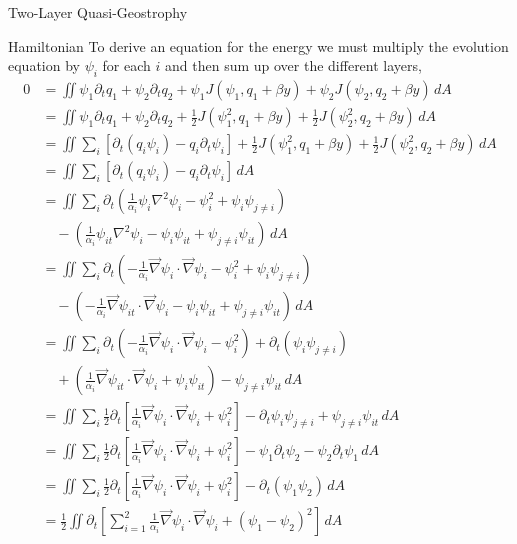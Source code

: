 \documentclass[12pt]{article}
\begin{document}
\begin{section}{Two-Layer Quasi-Geostrophy}
    \begin{subsection}{Hamiltonian}
        To derive an equation for the energy we must multiply the evolution equation by $\psi_i$ for each $i$ and then sum up over the different layers,
        \begin{align*}
            0 &= \iint \psi_1 \partial_t q_1 + \psi_2 \partial_t q_2 + \psi_1 J(\psi_1, q_1 + \beta y) + \psi_2 J(\psi_2, q_2 + \beta y) \, dA \\
            &= \iint \psi_1 \partial_t q_1 + \psi_2 \partial_t q_2 + \frac12 J(\psi_1^2, q_1 + \beta y) + \frac12 J(\psi_2^2, q_2 + \beta y) \, dA \\
            &= \iint \sum_i \left[\partial_t(q_i \psi_i) - q_i \partial_t\psi_i \right] + \frac12 J(\psi_1^2, q_1 + \beta y) + \frac12 J(\psi_2^2, q_2 + \beta y) \, dA \\
            &= \iint \sum_i \left[\partial_t(q_i \psi_i) - q_i \partial_t\psi_i \right] \, dA \\
            &= \iint \sum_i \partial_t \left (\frac{1}{\alpha_i}\psi_i \nabla^2 \psi_i - \psi_i^2 + \psi_i\psi_{j\ne i} \right) \\
            &\quad - \left( \frac{1}{\alpha_i} \psi_{it} \nabla^2 \psi_i - \psi_i \psi_{it} + \psi_{j \ne i} \psi_{it} \right) \, dA \\
            &= \iint \sum_i \partial_t \left (-\frac{1}{\alpha_i} \vec\nabla \psi_i \cdot \vec\nabla \psi_i - \psi_i^2 + \psi_i\psi_{j\ne i} \right) \\
            &\quad - \left( -\frac{1}{\alpha_i} \vec\nabla \psi_{it} \cdot \vec\nabla \psi_i - \psi_i \psi_{it} + \psi_{j \ne i} \psi_{it} \right) \, dA \\
            &= \iint \sum_i \partial_t \left (-\frac{1}{\alpha_i} \vec\nabla \psi_i \cdot \vec\nabla \psi_i - \psi_i^2 \right) + \partial_t (\psi_i\psi_{j\ne i})  \\
            &\quad + \left( \frac{1}{\alpha_i} \vec\nabla \psi_{it} \cdot \vec\nabla \psi_i + \psi_i \psi_{it} \right) - \psi_{j \ne i} \psi_{it} \, dA \\
            &= \iint \sum_i \frac12 \partial_t \left[ \frac{1}{\alpha_i} \vec\nabla \psi_i \cdot \vec\nabla \psi_i + \psi_i^2 \right] - \partial_t \psi_i\psi_{j\ne i} + \psi_{j \ne i} \psi_{it} \, dA \\
            &= \iint  \sum_i \frac12 \partial_t \left[ \frac{1}{\alpha_i} \vec\nabla \psi_i \cdot  \vec\nabla \psi_i + \psi_i^2 \right] - \psi_1 \partial_t \psi_2  -  \psi_2 \partial_t \psi_1\, dA \\
            &= \iint  \sum_i \frac12 \partial_t \left[ \frac{1}{\alpha_i} \vec\nabla \psi_i \cdot  \vec\nabla \psi_i + \psi_i^2 \right] -  \partial_t (\psi_1\psi_2)\, dA \\
            &= \frac12 \iint \partial_t \left[ \sum_{i=1}^2 \frac{1}{\alpha_i} \vec\nabla \psi_i \cdot \vec\nabla \psi_i + (\psi_1 - \psi_2)^2 \right]\, dA
        \end{align*}


\end{subsection}
\end{section}
\end{document}
